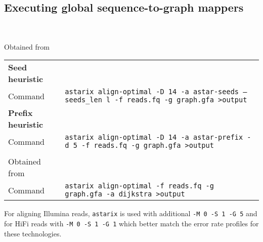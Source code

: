 \subsection{Executing global sequence-to-graph mappers} \label{sec:astarix-commands}

\noindent
\begin{tabular}{lp{9.5cm}}
\end{tabular}


 \\
\noindent Obtained from \astarixurl \\
\noindent
\begin{tabular}{lp{9.5cm}}
	\textbf{Seed heuristic} & \\
	\quad Command & \texttt{astarix align-optimal -D 14 -a astar-seeds --seeds\_len l -f reads.fq -g graph.gfa >output} \\
	\textbf{Prefix heuristic} & \\
	\quad Command & \texttt{astarix align-optimal -D 14 -a astar-prefix -d 5 -f reads.fq -g graph.gfa >output} \\
	\textbf{\dijkstra} & \\
	\quad Obtained from & \astarixurlwithbranch \\
	\quad Command & \texttt{astarix align-optimal -f reads.fq -g graph.gfa -a dijkstra >output}
\end{tabular}

For aligning Illumina reads, \texttt{astarix} is used with additional \texttt{-M
0 -S 1 -G 5} and for HiFi reads with \texttt{-M 0 -S 1 -G 1} which better match
the error rate profiles for these technologies.

